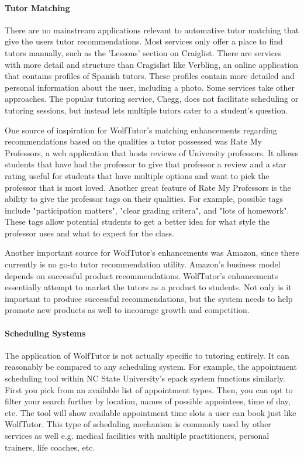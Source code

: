 \paragraph{Tutor Matching}
There are no mainstream applications relevant to automative tutor matching that give the users tutor recommendations. 
Most services only offer a place to find tutors manually, such as the 'Lessons' section on Craiglist. \cite{RefWorks:doc:5abd46a5e4b0770b05a4080c} 
There are services with more detail and structure than Cragislist like Verbling, an online application that contains profiles of Spanish tutors. 
These profiles contain more detailed and personal information about the user, including a photo. \cite{RefWorks:doc:5abd466ce4b0689719ee9277} 
Some services take other approaches. 
The popular tutoring service, Chegg, does not facilitate scheduling or tutoring sessions, 
but instead lets multiple tutors cater to a student's question. \cite{RefWorks:doc:5abd45f7e4b0770b05a407c4}

One source of inspiration for WolfTutor's matching enhancements regarding recommendations 
based on the qualities a tutor possessed was Rate My Professors, a web application that hosts reviews of University professors. 
It allows students that have had the professor to give that professor a review and a star rating useful for
students that have multiple options and want to pick the professor that is most loved. Another great
feature of Rate My Professors is the ability to give the professor tags on their qualities. For example, possible tags
include "participation matters", "clear grading critera", and "lots of homework". \cite{rate-my-prof} These tags allow potential students to
get a better idea for what style the professor uses and what to expect for the class.

Another important source for WolfTutor's enhancements was Amazon, since there currently is 
no go-to tutor recommendation utility.\cite{amazon} Amazon's business model depends on successful product recommendations.
WolfTutor's enhancements essentially attempt to market the tutors as a product to students. Not only is it important
to produce successful recommendations, but the system needs to help promote new products as well to incourage 
growth and competition.

\paragraph{Scheduling Systems}
\label{sec:comparisons:scheduling}
The application of WolfTutor is not actually specific to tutoring entirely.
It can reasonably be compared to any scheduling system.
For example, the appointment scheduling tool within NC State University's epack system functions similarly.
First you pick from an available list of appointment types. Then, you can opt to filter your search further by location, names of possible appointees, time of day, etc.
The tool will show available appointment time slots a user can book just like WolfTutor.
This type of scheduling mechanism is commonly used by other services as well e.g. medical facilities with multiple practitioners, personal trainers, life coaches, etc.





